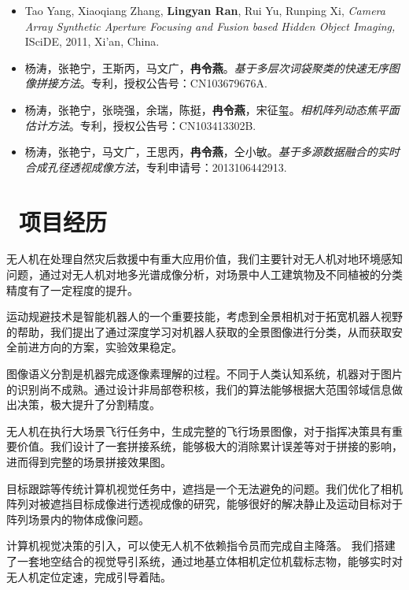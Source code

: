 \documentclass{resume}
\begin{document}
\begin{itemize}
  \item Tao Yang, Xiaoqiang Zhang, \textbf{Lingyan Ran}, Rui Yu, Runping Xi, \textit{Camera Array Synthetic Aperture Focusing and Fusion based Hidden Object Imaging,} ISciDE, 2011, Xi'an, China.
  \item 杨涛，张艳宁，王斯丙，马文广，\textbf{冉令燕}。\textit{基于多层次词袋聚类的快速无序图像拼接方法}。专利，授权公告号：CN103679676A.
  \item 杨涛，张艳宁，张晓强，余瑞，陈挺，\textbf{冉令燕}，宋征玺。\textit{相机阵列动态焦平面估计方法}。专利，授权公告号：CN103413302B.
  \item 杨涛，张艳宁，马文广，王思丙，\textbf{冉令燕}，仝小敏。\textit{基于多源数据融合的实时合成孔径透视成像方法}，专利申请号：2013106442913.
\end{itemize}

\section{\faUsers\ 项目经历}
无人机在处理自然灾后救援中有重大应用价值，我们主要针对无人机对地环境感知问题，通过对无人机对地多光谱成像分析，对场景中人工建筑物及不同植被的分类精度有了一定程度的提升。

运动规避技术是智能机器人的一个重要技能，考虑到全景相机对于拓宽机器人视野的帮助，我们提出了通过深度学习对机器人获取的全景图像进行分类，从而获取安全前进方向的方案，实验效果稳定。

图像语义分割是机器完成逐像素理解的过程。不同于人类认知系统，机器对于图片的识别尚不成熟。通过设计非局部卷积核，我们的算法能够根据大范围邻域信息做出决策，极大提升了分割精度。

无人机在执行大场景飞行任务中，生成完整的飞行场景图像，对于指挥决策具有重要价值。我们设计了一套拼接系统，能够极大的消除累计误差等对于拼接的影响，进而得到完整的场景拼接效果图。

目标跟踪等传统计算机视觉任务中，遮挡是一个无法避免的问题。我们优化了相机阵列对被遮挡目标成像进行透视成像的研究，能够很好的解决静止及运动目标对于阵列场景内的物体成像问题。

计算机视觉决策的引入，可以使无人机不依赖指令员而完成自主降落。
我们搭建了一套地空结合的视觉导引系统，通过地基立体相机定位机载标志物，能够实时对无人机定位定速，完成引导着陆。
\end{document}
